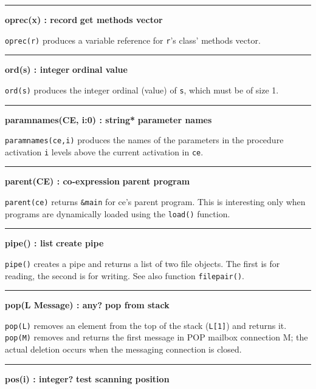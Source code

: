 \bigskip\hrule\vspace{0.1cm}
\noindent
{\bf oprec(x) : record } \hfill {\bf get methods vector}

\noindent
\texttt{oprec(r)} produces a variable reference for
\texttt{r}'s class' methods vector.

\bigskip\hrule\vspace{0.1cm}
\noindent
{\bf ord(s) : integer } \hfill {\bf ordinal value}

\noindent
{}\texttt{ord(s)} produces the integer ordinal
(value) of \texttt{s}, which must be of size 1.

\bigskip\hrule\vspace{0.1cm}
\noindent
{\bf paramnames(CE, i:0) : string* } \hfill {\bf parameter names}

\noindent
{}\texttt{paramnames(ce,i)} produces the names of
the parameters in the procedure activation \texttt{i} levels above the
current activation in \texttt{ce}.

\bigskip\hrule\vspace{0.1cm}
\noindent
{\bf parent(CE) : co{}-expression } \hfill {\bf parent program}

\noindent
\texttt{parent(ce)} returns \texttt{\&main} for ce's
parent program. This is interesting only when programs are dynamically
loaded using the \texttt{load()} function.

\bigskip\hrule\vspace{0.1cm}
\noindent
{\bf pipe() : list } \hfill {\bf create pipe}

\noindent
{}\texttt{pipe()} creates a pipe and returns a list of two
file objects. The first is for reading, the second is for writing. See
also function \texttt{filepair()}.

\bigskip\hrule\vspace{0.1cm}
\noindent
{\bf pop(L {\textbar} Message) : any? } \hfill {\bf pop from stack}\WarningNotThreadSafe

\noindent
{}\texttt{pop(L)} removes an element from the top of the
stack (\texttt{L[1]}) and returns it. \texttt{pop(M)}
removes and returns the first message in POP mailbox connection M; the
actual deletion occurs when the messaging connection is closed.

\bigskip\hrule\vspace{0.1cm}
\noindent
{\bf pos(i) : integer? } \hfill {\bf test scanning position}

